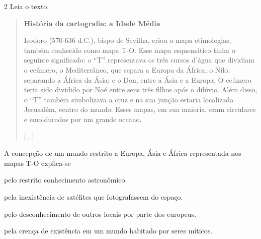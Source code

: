 
\num{2} Leia o texto.

\begin{quote}
\textbf{História da cartografia: a Idade Média}

Isodoro (570-636 d.C.), bispo de Sevilha, criou o mapa
etimologias, também conhecido como mapa T-O. Esse mapa esquemático tinha
o seguinte significado: o ``T'' representava os três cursos d'água que
dividiam o ecúmero, o Mediterrâneo, que separa a Europa da África; o
Nilo, separando a África da Ásia; e o Don, entre a Ásia e a Europa. O
ecúmero teria sido dividido por Noé entre seus três filhos após o
dilúvio. Além disso, o ``T'' também simbolizava a cruz e na sua junção
estaria localizada Jerusalém, centro do mundo. Esses mapas, em sua
maioria, eram circulares e emoldurados por um grande oceano.

{[}...{]}

\end{quote}

A concepção de um mundo restrito a Europa, Ásia e África representada
nos mapas T-O explica-se

\begin{escolha}
\item
  pelo restrito conhecimento astronômico.
\item
  pela inexistência de satélites que fotografassem do espaço.
\item
  pelo desconhecimento de outros locais por parte dos europeus.
\item
  pela crença de existência em um mundo habitado por seres míticos.
\end{escolha}

